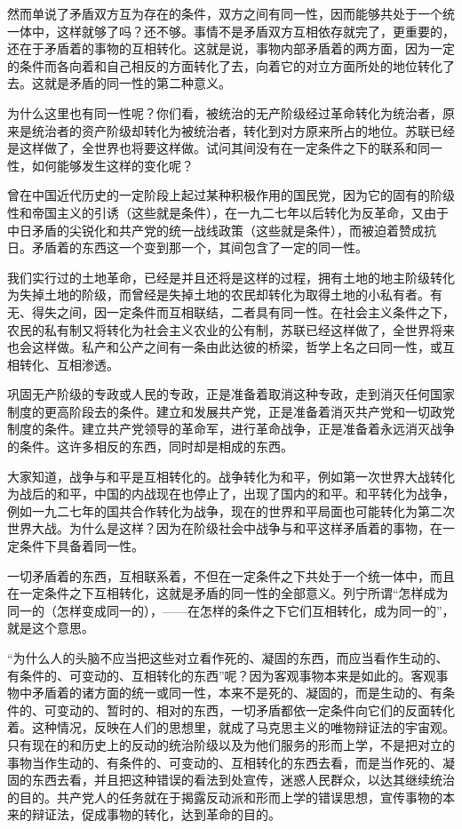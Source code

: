 然而单说了矛盾双方互为存在的条件，双方之间有同一性，因而能够共处于一个统一体中，这样就够了吗？还不够。事情不是矛盾双方互相依存就完了，更重要的，还在于矛盾着的事物的互相转化。这就是说，事物内部矛盾着的两方面，因为一定的条件而各向着和自己相反的方面转化了去，向着它的对立方面所处的地位转化了去。这就是矛盾的同一性的第二种意义。

为什么这里也有同一性呢？你们看，被统治的无产阶级经过革命转化为统治者，原来是统治者的资产阶级却转化为被统治者，转化到对方原来所占的地位。苏联已经是这样做了，全世界也将要这样做。试问其间没有在一定条件之下的联系和同一性，如何能够发生这样的变化呢？

曾在中国近代历史的一定阶段上起过某种积极作用的国民党，因为它的固有的阶级性和帝国主义的引诱（这些就是条件），在一九二七年以后转化为反革命，又由于中日矛盾的尖锐化和共产党的统一战线政策（这些就是条件），而被迫着赞成抗日。矛盾着的东西这一个变到那一个，其间包含了一定的同一性。

我们实行过的土地革命，已经是并且还将是这样的过程，拥有土地的地主阶级转化为失掉土地的阶级，而曾经是失掉土地的农民却转化为取得土地的小私有者。有无、得失之间，因一定条件而互相联结，二者具有同一性。在社会主义条件之下，农民的私有制又将转化为社会主义农业的公有制，苏联已经这样做了，全世界将来也会这样做。私产和公产之间有一条由此达彼的桥梁，哲学上名之曰同一性，或互相转化、互相渗透。

巩固无产阶级的专政或人民的专政，正是准备着取消这种专政，走到消灭任何国家制度的更高阶段去的条件。建立和发展共产党，正是准备着消灭共产党和一切政党制度的条件。建立共产党领导的革命军，进行革命战争，正是准备着永远消灭战争的条件。这许多相反的东西，同时却是相成的东西。

大家知道，战争与和平是互相转化的。战争转化为和平，例如第一次世界大战转化为战后的和平，中国的内战现在也停止了，出现了国内的和平。和平转化为战争，例如一九二七年的国共合作转化为战争，现在的世界和平局面也可能转化为第二次世界大战。为什么是这样？因为在阶级社会中战争与和平这样矛盾着的事物，在一定条件下具备着同一性。

一切矛盾着的东西，互相联系着，不但在一定条件之下共处于一个统一体中，而且在一定条件之下互相转化，这就是矛盾的同一性的全部意义。列宁所谓“怎样成为同一的（怎样变成同一的），——在怎样的条件之下它们互相转化，成为同一的”，就是这个意思。

“为什么人的头脑不应当把这些对立看作死的、凝固的东西，而应当看作生动的、有条件的、可变动的、互相转化的东西”呢？因为客观事物本来是如此的。客观事物中矛盾着的诸方面的统一或同一性，本来不是死的、凝固的，而是生动的、有条件的、可变动的、暂时的、相对的东西，一切矛盾都依一定条件向它们的反面转化着。这种情况，反映在人们的思想里，就成了马克思主义的唯物辩证法的宇宙观。只有现在的和历史上的反动的统治阶级以及为他们服务的形而上学，不是把对立的事物当作生动的、有条件的、可变动的、互相转化的东西去看，而是当作死的、凝固的东西去看，并且把这种错误的看法到处宣传，迷惑人民群众，以达其继续统治的目的。共产党人的任务就在于揭露反动派和形而上学的错误思想，宣传事物的本来的辩证法，促成事物的转化，达到革命的目的。

